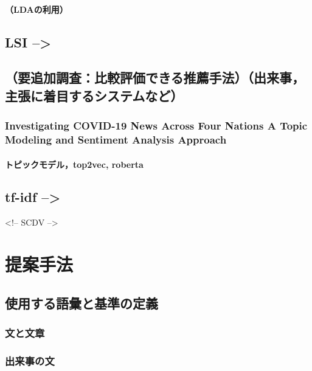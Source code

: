 \documentclass[12pt,a4j]{jreport}
\begin{document}
\subsubsection{（LDAの利用）}


\section{LSI -->}


\section{（要追加調査：比較評価できる推薦手法）（出来事，主張に着目するシステムなど）}


\subsection{Investigating COVID-19 News Across Four Nations A Topic Modeling and Sentiment Analysis Approach}


\subsubsection{トピックモデル，top2vec, roberta}


\section{tf-idf -->}
<!-- SCDV -->


\chapter{提案手法}


\section{使用する語彙と基準の定義}


\subsection{文と文章}


\subsection{出来事の文}
\end{document}
